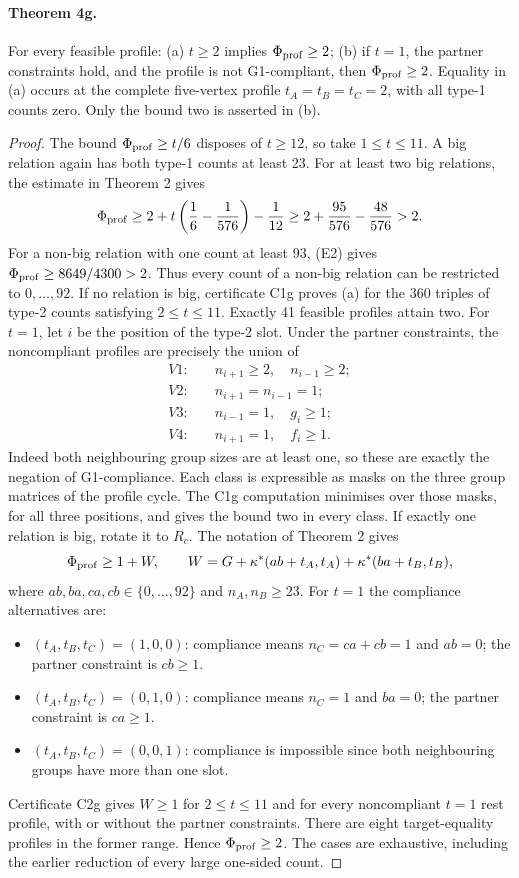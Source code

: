 \paragraph{Theorem 4g.} For every feasible profile: (a) $t\geq2$ implies $\Phi_{\rm prof}\geq2$; (b) if $t=1$, the partner constraints hold, and the profile is not G1-compliant, then $\Phi_{\rm prof}\geq2$.
Equality in (a) occurs at the complete five-vertex profile $t_A=t_B=t_C=2$, with all type-1 counts zero. Only the bound two is asserted in (b).
\begin{proof}
The bound $\Phi_{\rm prof}\geq t/6$ disposes of $t\geq12$, so take $1\leq t\leq11$. A big relation again has both type-1 counts at least 23.
For at least two big relations, the estimate in Theorem 2 gives
\[
 \Phi_{\rm prof}\geq2+t\left(\frac16-\frac1{576}\right)-\frac1{12}
 \geq2+\frac{95}{576}-\frac{48}{576}>2.
\]
For a non-big relation with one count at least 93, (E2) gives $\Phi_{\rm prof}\geq8649/4300>2$. Thus every count of a non-big relation can be restricted to $0,\ldots,92$.
If no relation is big, certificate C1g proves (a) for the 360 triples of type-2 counts satisfying $2\leq t\leq11$. Exactly 41 feasible profiles attain two. For $t=1$, let $i$ be the position of the type-2 slot. Under the partner constraints, the noncompliant profiles are precisely the union of
\begin{align*}
 V1:&\quad n_{i+1}\geq2,\quad n_{i-1}\geq2;\\
 V2:&\quad n_{i+1}=n_{i-1}=1;\\
 V3:&\quad n_{i-1}=1,\quad g_i\geq1;\\
 V4:&\quad n_{i+1}=1,\quad f_i\geq1.
\end{align*}
Indeed both neighbouring group sizes are at least one, so these are exactly the negation of G1-compliance. Each class is expressible as masks on the three group matrices of the profile cycle. The C1g computation minimises over those masks, for all three positions, and gives the bound two in every class.
If exactly one relation is big, rotate it to $R_c$. The notation of Theorem 2 gives
\[
 \Phi_{\rm prof}\geq1+W,\qquad
 W=G+\kappa^*(ab+t_A,t_A)+\kappa^*(ba+t_B,t_B),
\]
where $ab,ba,ca,cb\in\{0,\ldots,92\}$ and $n_A,n_B\geq23$. For $t=1$ the compliance alternatives are:
\begin{itemize}
\item $(t_A,t_B,t_C)=(1,0,0)$: compliance means $n_C=ca+cb=1$ and $ab=0$; the partner constraint is $cb\geq1$.
\item $(t_A,t_B,t_C)=(0,1,0)$: compliance means $n_C=1$ and $ba=0$; the partner constraint is $ca\geq1$.
\item $(t_A,t_B,t_C)=(0,0,1)$: compliance is impossible since both neighbouring groups have more than one slot.
\end{itemize}
Certificate C2g gives $W\geq1$ for $2\leq t\leq11$ and for every noncompliant $t=1$ rest profile, with or without the partner constraints. There are eight target-equality profiles in the former range. Hence $\Phi_{\rm prof}\geq2$. The cases are exhaustive, including the earlier reduction of every large one-sided count.
\end{proof}

